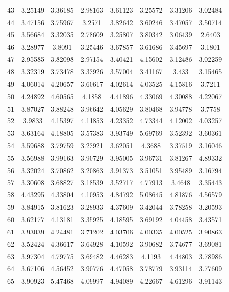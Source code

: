 \begin{figure}
\begin{tabular}{cccccccc}
43 & 3.25149 & 3.36185 & 2.98163 & 3.61123 & 3.25572 & 3.31206 & 3.02484\\
44 & 3.47156 & 3.75967 & 3.2571 & 3.82642 & 3.60246 & 3.47057 & 3.50714\\
45 & 3.56684 & 3.32035 & 2.78609 & 3.25807 & 3.80342 & 3.06439 & 2.6403\\
46 & 3.28977 & 3.8091 & 3.25446 & 3.67857 & 3.61686 & 3.45697 & 3.1801\\
47 & 2.95585 & 3.82098 & 2.97154 & 3.40421 & 4.15602 & 3.12486 & 3.02259\\
48 & 3.32319 & 3.73478 & 3.33926 & 3.57004 & 3.41167 & 3.433 & 3.15465\\
49 & 4.06014 & 4.20657 & 3.60617 & 4.02614 & 4.03525 & 4.15816 & 3.7211\\
50 & 4.24892 & 4.60565 & 4.1858 & 4.41896 & 4.33069 & 4.30088 & 4.22067\\
51 & 3.87027 & 3.88248 & 3.96642 & 4.05629 & 3.80468 & 3.94778 & 3.7758\\
52 & 3.9833 & 4.15397 & 4.11853 & 4.23352 & 4.73344 & 4.12002 & 4.03257\\
53 & 3.63164 & 4.18805 & 3.57383 & 3.93749 & 5.69769 & 3.52392 & 3.60361\\
54 & 3.59688 & 3.79759 & 3.23921 & 3.62051 & 4.3688 & 3.37519 & 3.16046\\
55 & 3.56988 & 3.99163 & 3.90729 & 3.95005 & 3.96731 & 3.81267 & 4.89332\\
56 & 3.32024 & 3.70862 & 3.20863 & 3.91373 & 3.51051 & 3.95489 & 3.16794\\
57 & 3.30608 & 3.68827 & 3.18539 & 3.52717 & 4.77913 & 3.4648 & 3.35443\\
58 & 4.43295 & 4.33804 & 4.10953 & 4.84792 & 5.08645 & 4.81876 & 4.56579\\
59 & 3.84915 & 3.81623 & 3.28933 & 4.37609 & 3.42044 & 3.78258 & 3.20593\\
60 & 3.62177 & 4.13181 & 3.35925 & 4.18595 & 3.69192 & 4.04458 & 3.43571\\
61 & 3.93039 & 4.24481 & 3.71202 & 4.03706 & 4.00335 & 4.00525 & 3.90863\\
62 & 3.52424 & 4.36617 & 3.64928 & 4.10592 & 3.90682 & 3.74677 & 3.69081\\
63 & 3.97304 & 4.79775 & 3.69482 & 4.46283 & 4.1193 & 4.44803 & 3.78986\\
64 & 3.67106 & 4.56452 & 3.90776 & 4.47058 & 3.78779 & 3.93114 & 3.77609\\
65 & 3.90923 & 5.47468 & 4.09997 & 4.94089 & 4.22667 & 4.61296 & 3.91143\\

\end{tabular}
\end{figure}

